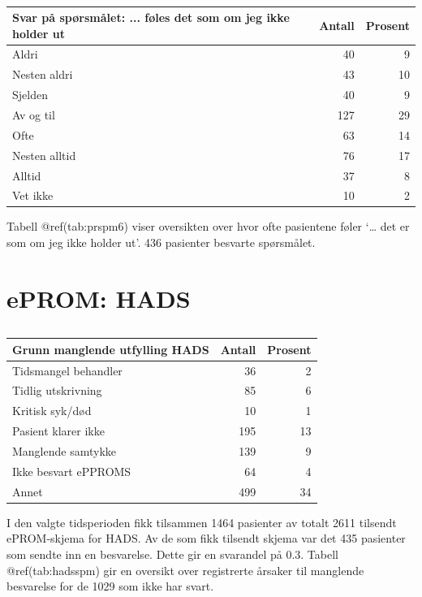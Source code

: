 \documentclass[
]{article}
\begin{document}
\begin{table}

\caption{\label{tab:prspm6}}
\centering
\begin{tabular}[t]{l|r|r}
\hline
Svar på spørsmålet: ... føles det som om jeg ikke holder ut & Antall  & Prosent\\
\hline
Aldri & 40 & 9\\
\hline
Nesten aldri & 43 & 10\\
\hline
Sjelden & 40 & 9\\
\hline
Av og til & 127 & 29\\
\hline
Ofte & 63 & 14\\
\hline
Nesten alltid & 76 & 17\\
\hline
Alltid & 37 & 8\\
\hline
Vet ikke & 10 & 2\\
\hline
\end{tabular}
\end{table}

Tabell @ref(tab:prspm6) viser oversikten over hvor ofte pasientene føler
`\ldots{} det er som om jeg ikke holder ut'. 436 pasienter besvarte
spørsmålet.

\hypertarget{eprom-hads}{%
\section{ePROM: HADS}\label{eprom-hads}}

\begin{table}

\caption{\label{tab:hadsspm}}
\centering
\begin{tabular}[t]{l|r|r}
\hline
Grunn manglende utfylling HADS & Antall  & Prosent\\
\hline
Tidsmangel behandler & 36 & 2\\
\hline
Tidlig utskrivning & 85 & 6\\
\hline
Kritisk syk/død & 10 & 1\\
\hline
Pasient klarer ikke & 195 & 13\\
\hline
Manglende samtykke & 139 & 9\\
\hline
Ikke besvart ePPROMS & 64 & 4\\
\hline
Annet & 499 & 34\\
\hline
\end{tabular}
\end{table}

I den valgte tidsperioden fikk tilsammen 1464 pasienter av totalt 2611
tilsendt ePROM-skjema for HADS. Av de som fikk tilsendt skjema var det
435 pasienter som sendte inn en besvarelse. Dette gir en svarandel på
0.3. Tabell @ref(tab:hadsspm) gir en oversikt over registrerte årsaker
til manglende besvarelse for de 1029 som ikke har svart.
\end{document}
